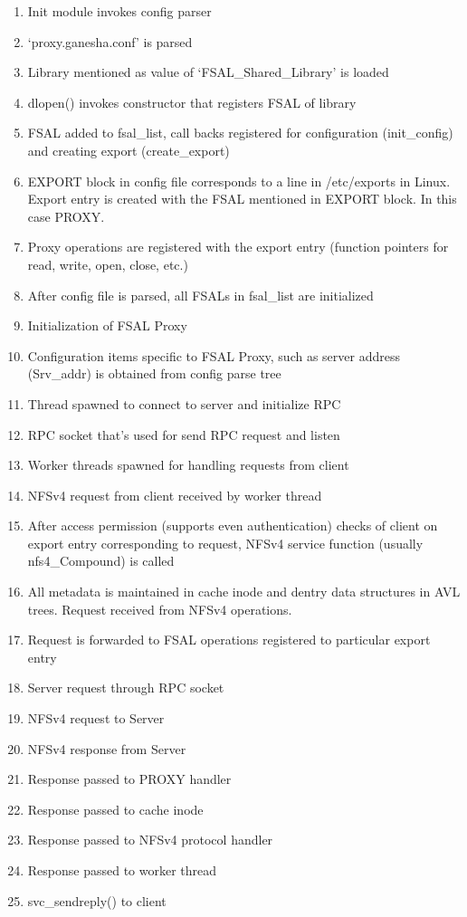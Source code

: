\documentclass[11pt, journal, twocolumn, twoside]{IEEEtran}
\begin{document}
\begin{enumerate}
\item Init module invokes config parser %
\item `proxy.ganesha.conf' is parsed %
\item Library mentioned as value of `FSAL\_Shared\_Library' is loaded %
\item dlopen() invokes constructor that registers FSAL of library %
\item FSAL added to fsal\_list, call backs registered for configuration (init\_config) and creating export (create\_export) %
\item EXPORT block in config file corresponds to a line in /etc/exports in Linux. Export entry is created with the FSAL
mentioned in EXPORT block. In this case PROXY. %
\item Proxy operations are registered with the export entry (function pointers for read, write, open, close, etc.) %
\item After config file is parsed, all FSALs in fsal\_list are initialized %
\item Initialization of FSAL Proxy %
\item Configuration items specific to FSAL Proxy, such as server address (Srv\_addr) is obtained from config parse tree %
\item Thread spawned to connect to server and initialize RPC %
\item RPC socket that's used for send RPC request and listen %
\item Worker threads spawned for handling requests from client %
\item NFSv4 request from client received by worker thread %
\item After access permission (supports even authentication) checks of client on export entry corresponding to request, NFSv4 service function (usually nfs4\_Compound) is called %
\item All metadata is maintained in cache inode and dentry data structures in AVL trees. Request received from NFSv4 operations. %
\item Request is forwarded to FSAL operations registered to particular export entry %
\item Server request through RPC socket %
\item NFSv4 request to Server %
\item NFSv4 response from Server %
\item Response passed to PROXY handler %
\item Response passed to cache inode %
\item Response passed to NFSv4 protocol handler %
\item Response passed to worker thread %
\item svc\_sendreply() to client %
\end{enumerate}
\end{document}
